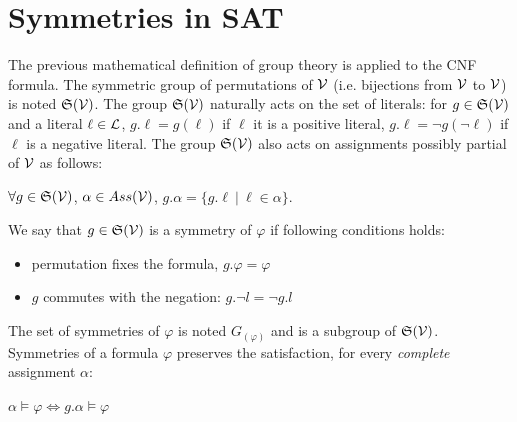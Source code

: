 \section{Symmetries in SAT}
The previous mathematical definition of group theory is applied to the CNF formula.
The symmetric group of permutations of $\mathcal{V}$ (i.e. bijections from $\mathcal{V}$ to $\mathcal{V}$) is noted
$\mathfrak{S}(\mathcal{V})$. The group $\mathfrak{S}(\mathcal{V})$ naturally acts on the set of literals: for $g
\in \mathfrak{S}(\mathcal{V})$ and a literal $\ell \in \mathcal{L} $, $g.\ell = g(\ell)$ if $\ell$ it is a
positive literal, $g.\ell = \neg g(\neg \ell)$ if $\ell$ is a negative literal.
The group $\mathfrak{S}(\mathcal{V})$ also acts on  assignments possibly partial of $\mathcal{V}$ as follows: 
\begin{center}
 $\forall g \in \mathfrak{S}(\mathcal{V})$, $\alpha \in Ass(\mathcal{V})$, $g.\alpha = \{ g.\ell ~|~ \ell \in \alpha \}$.
\end{center}
 We say that $g\in \mathfrak{S}(\mathcal{V})$ is a symmetry of $ \varphi$ if following conditions holds:
\begin{itemize}[topsep=0em]
 \item permutation fixes the formula, $g.\varphi =  \varphi$ 
 \item $g$  commutes with the negation: $g.\neg l  = \neg g.l$
\end{itemize}
The set of symmetries of $\varphi$ is noted $G_(\varphi)$ and is a subgroup of $\mathfrak{S}(\mathcal{V})$.
Symmetries of a formula $\varphi$ preserves the satisfaction, for every \emph{complete} assignment $\alpha$:
\begin{center}
 $\alpha \models \varphi\Leftrightarrow g.\alpha \models \varphi$
\end{center}
% 


